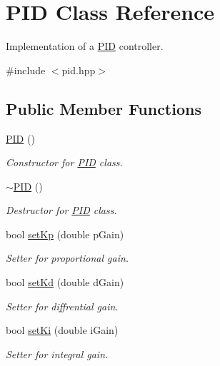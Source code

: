 \hypertarget{classPID}{}\section{P\+ID Class Reference}
\label{classPID}


Implementation of a \hyperlink{classPID}{P\+ID} controller.  




{\ttfamily \#include $<$pid.\+hpp$>$}

\subsection*{Public Member Functions}
\begin{DoxyCompactItemize}
\item 
\hyperlink{classPID_a0311b6f7de348499ce24e53ba353514a}{P\+ID} ()
\begin{DoxyCompactList}\small\item\em Constructor for \hyperlink{classPID}{P\+ID} class. \end{DoxyCompactList}\item 
\mbox{\label{classPID_ab7d389fc5b88d881bc25f5dafd360441}} 
\hyperlink{classPID_ab7d389fc5b88d881bc25f5dafd360441}{$\sim$\+P\+ID} ()
\begin{DoxyCompactList}\small\item\em Destructor for \hyperlink{classPID}{P\+ID} class. \end{DoxyCompactList}\item 
bool \hyperlink{classPID_af2a06a6aacd89993347f6adbc906e9a2}{set\+Kp} (double p\+Gain)
\begin{DoxyCompactList}\small\item\em Setter for proportional gain. \end{DoxyCompactList}\item 
bool \hyperlink{classPID_a91359adee27385a381690ae548afe976}{set\+Kd} (double d\+Gain)
\begin{DoxyCompactList}\small\item\em Setter for diffrential gain. \end{DoxyCompactList}\item 
bool \hyperlink{classPID_af0d5d19e1657530e1cbca6ed675629e0}{set\+Ki} (double i\+Gain)
\begin{DoxyCompactList}\small\item\em Setter for integral gain. \end{DoxyCompactList}\item 

\end{DoxyCompactItemize}
